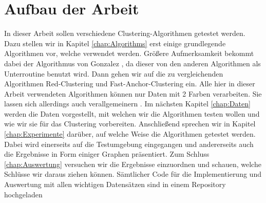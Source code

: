 \section{Aufbau der Arbeit}
    In dieser Arbeit sollen verschiedene Clustering-Algorithmen getestet werden. Dazu stellen wir in Kapitel \ref{chap:Algorithms} erst einige grundlegende Algorithmen vor, welche verwendet werden. Größere Aufmerksamkeit bekommt dabei der Algorithmus von Gonzalez \cite{GONZALEZ1985293}, da dieser von den anderen Algorithmen als Unterroutine benutzt wird. Dann gehen wir auf die zu vergleichenden Algorithmen Red-Clustering \cite{chierichetti2018fair} und Fast-Anchor-Clustering \cite{BA_Clustering_Irina} ein. Alle hier in dieser Arbeit verwendeten Algorithmen können nur Daten mit 2 Farben verarbeiten. Sie lassen sich allerdings auch verallgemeinern \cite{BA_Clustering_Irina} \cite{chierichetti2018fair}. Im nächsten Kapitel \ref{chap:Daten} werden die Daten vorgestellt, mit welchen wir die Algorithmen testen wollen und wie wir sie für das Clustering vorbereiten. \newline
    Anschließend sprechen wir in Kapitel \ref{chap:Experimente} darüber, auf welche Weise die Algorithmen getestet werden. Dabei wird einerseits auf die Testumgebung eingegangen und andererseits auch die Ergebnisse in Form einiger Graphen präsentiert. Zum Schluss \ref{chap:Auswertung} versuchen wir die Ergebnisse einzuordnen und schauen, welche Schlüsse wir daraus ziehen können.
    Sämtlicher Code für die Implementierung und Auswertung mit allen wichtigen Datensätzen sind in einem Repository hochgeladen \cite{Code-Repository}